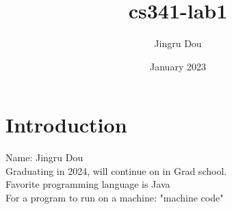 \documentclass{article}
\title{cs341-lab1}
\author{Jingru Dou}
\date{January 2023}
\begin{document}
\maketitle

\section{Introduction}
Name: Jingru Dou\\
Graduating in 2024, will continue on in Grad school.\\
Favorite programming language is Java\\
For a program to run on a machine: "machine code"
\end{document}
